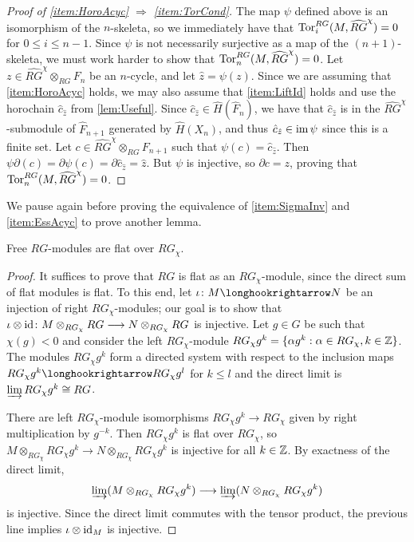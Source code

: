 \documentclass[11pt, letterpaper]{amsart}
\begin{document}
\begin{proof}[Proof of \ref{item:HoroAcyc} $\Longrightarrow$ \ref{item:TorCond}] The map $\psi$ defined above is an isomorphism of the $n$-skeleta, so we immediately have that $\operatorname{Tor}_i^{RG}(M, \widehat{RG}^\chi) = 0$ for $0 \leqslant i \leqslant n-1$. Since $\psi$ is not necessarily surjective as a map of the $(n+1)$-skeleta, we must work harder to show that $\operatorname{Tor}_n^{RG}(M, \widehat{RG}^\chi) = 0$. Let $z \in \widehat{RG}^\chi \otimes_{RG} F_n$ be an $n$-cycle, and let $\hat{z} = \psi(z)$. Since we are assuming that \ref{item:HoroAcyc} holds, we may also assume that \ref{item:LiftId} holds and use the horochain $\hat{c}_{\hat{z}}$ from \cref{lem:Useful}. Since $\hat{c}_{\hat{z}} \in \widehat{H}(\widehat{F}_n)$, we have that $\hat{c}_{\hat{z}}$ is in the $\widehat{RG}^\chi$-submodule of $\widehat{F}_{n+1}$ generated by $\widehat{H}(X_n)$, and thus $\hat{c}_{\hat{z}} \in \operatorname{im} \psi$ since this is a finite set. Let $c \in \widehat{RG}^\chi \otimes_{RG} F_{n+1}$ such that $\psi(c) = \hat{c}_{\hat{z}}$. Then $\psi \partial (c) = \partial \psi(c) = \partial \hat{c}_{\hat{z}} = \hat{z}$. But $\psi$ is injective, so $\partial c = z$, proving that $\operatorname{Tor}_n^{RG}(M, \widehat{RG}^\chi) = 0$.
\end{proof}


We pause again before proving the equivalence of \ref{item:SigmaInv} and \ref{item:EssAcyc} to prove another lemma. 

\begin{lem}\label{lem:flat}
Free $RG$-modules are flat over $RG_\chi$.
\end{lem}
\begin{proof}
It suffices to prove that $RG$ is flat as an $RG_\chi$-module, since the direct sum of flat modules is flat. To this end, let $\iota \colon M \longhookrightarrow N$ be an injection of right $RG_\chi$-modules; our goal is to show that $\iota \otimes \operatorname{id} \colon M \otimes_{RG_\chi} RG \longrightarrow N \otimes_{RG_\chi} RG$ is injective. Let $g \in G$ be such that $\chi(g) < 0$ and consider the left $RG_\chi$-module $RG_\chi g^k = \{ \alpha g^k : \alpha \in RG_\chi, k \in \mathbb{Z} \}$. The modules $RG_\chi g^k$ form a directed system with respect to the inclusion maps $RG_\chi g^k \longhookrightarrow RG_\chi g^l$ for $k \leqslant l$ and the direct limit is $\varinjlim RG_\chi g^k \cong RG$.

There are left $RG_\chi$-module isomorphisms $RG_\chi g^k \longrightarrow RG_\chi$ given by right multiplication by $g^{-k}$. Then $RG_\chi g^k$ is flat over $RG_\chi$, so $M \otimes_{RG_\chi} RG_\chi g^k \longrightarrow N \otimes_{RG_\chi} RG_\chi g^k$ is injective for all $k \in \mathbb{Z}$. By exactness of the direct limit,
\[
    \varinjlim(M \otimes_{RG_\chi} RG_\chi g^k) \longrightarrow \varinjlim(N \otimes_{RG_\chi} RG_\chi g^k)
\]
is injective. Since the direct limit commutes with the tensor product, the previous line implies $\iota \otimes \operatorname{id}_M$ is injective. \qedhere
\end{proof}
\end{document}
